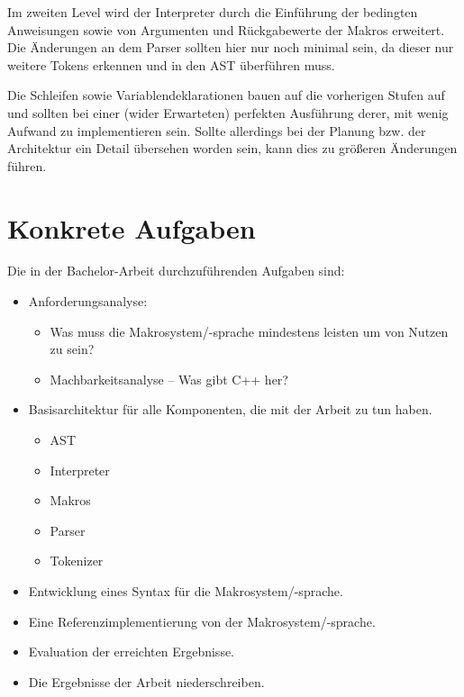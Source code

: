     Im zweiten Level wird der Interpreter durch die Einführung der bedingten Anweisungen sowie von Argumenten und Rückgabewerte der Makros erweitert. Die Änderungen an dem Parser sollten hier nur noch minimal sein, da dieser nur weitere Tokens erkennen und in den AST überführen muss.

    Die Schleifen sowie Variablendeklarationen bauen auf die vorherigen Stufen auf und sollten bei einer (wider Erwarteten) perfekten Ausführung derer, mit wenig Aufwand zu implementieren sein. Sollte allerdings bei der Planung bzw. der Architektur ein Detail übersehen worden sein, kann dies zu größeren Änderungen führen.

\section{Konkrete Aufgaben}
\label{sec:konkrete_aufgaben}
  Die in der Bachelor-Arbeit durchzuführenden Aufgaben sind:
  \begin{itemize}
    \item Anforderungsanalyse:
      \begin{itemize}
        \item Was muss die Makrosystem/-sprache mindestens leisten um von Nutzen zu sein?
        \item Machbarkeitsanalyse -- Was gibt C++ her?
      \end{itemize}
    \item Basisarchitektur für alle Komponenten, die mit der Arbeit zu tun haben.
      \begin{itemize}
        \item AST
        \item Interpreter
        \item Makros
        \item Parser
        \item Tokenizer
      \end{itemize}
    \item Entwicklung eines Syntax für die Makrosystem/-sprache.
    \item Eine Referenzimplementierung von der Makrosystem/-sprache.
    \item Evaluation der erreichten Ergebnisse.
    \item Die Ergebnisse der Arbeit niederschreiben.
  \end{itemize}

